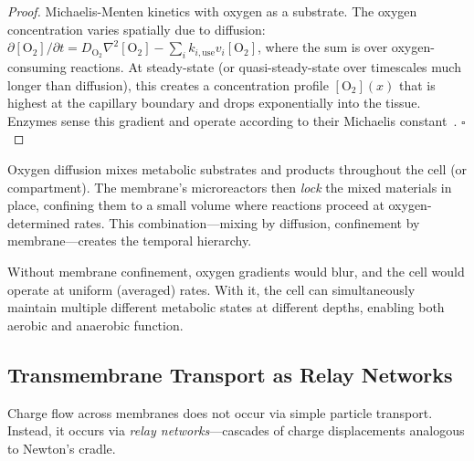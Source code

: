 \begin{proof}
Michaelis-Menten kinetics with oxygen as a substrate. The oxygen concentration varies spatially due to diffusion: $\partial [\text{O}_2]/\partial t = D_{\text{O}_2} \nabla^2 [\text{O}_2] - \sum_i k_{i,\text{use}} v_i[\text{O}_2]$, where the sum is over oxygen-consuming reactions. At steady-state (or quasi-steady-state over timescales much longer than diffusion), this creates a concentration profile $[\text{O}_2](x)$ that is highest at the capillary boundary and drops exponentially into the tissue. Enzymes sense this gradient and operate according to their Michaelis constant~\cite{CromerAnderson2006,TuttleWeinberg2017}. $\square$
\end{proof}

\begin{corollary}
\label{cor:oxygen-membrane}
Oxygen diffusion mixes metabolic substrates and products throughout the cell (or compartment). The membrane's microreactors then \emph{lock} the mixed materials in place, confining them to a small volume where reactions proceed at oxygen-determined rates. This combination—mixing by diffusion, confinement by membrane—creates the temporal hierarchy.

Without membrane confinement, oxygen gradients would blur, and the cell would operate at uniform (averaged) rates. With it, the cell can simultaneously maintain multiple different metabolic states at different depths, enabling both aerobic and anaerobic function.
\end{corollary}

\subsection{Transmembrane Transport as Relay Networks}
\label{subsec:relay-networks}

Charge flow across membranes does not occur via simple particle transport. Instead, it occurs via \emph{relay networks}—cascades of charge displacements analogous to Newton's cradle.

